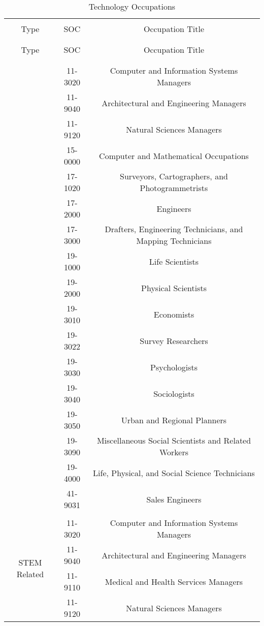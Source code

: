 
\begin{longtable}{ccc} %
  \caption{Technology Occupations} \label{tab:tab_tech_occ}\\
\hline \\[-1.8ex] 
Type & SOC & Occupation Title \\ 
\hline \\[-1.8ex] 
\endfirsthead
\hline \\[-1.8ex] 
Type & SOC & Occupation Title \\ 
\hline \\[-1.8ex] 
\endhead
\hline \\[-1.8ex] 
\endfoot
\multirow{17}{*}{STEM} & 11-3020 & Computer and Information Systems Managers \\ 
 & 11-9040 & Architectural and Engineering Managers \\ 
 & 11-9120 & Natural Sciences Managers \\ 
 & 15-0000 & Computer and Mathematical Occupations \\ 
 & 17-1020 & Surveyors, Cartographers, and Photogrammetrists  \\ 
 & 17-2000 & Engineers \\ 
 & 17-3000 & Drafters, Engineering Technicians, and Mapping Technicians \\ 
 & 19-1000 & Life Scientists \\ 
 & 19-2000 & Physical Scientists  \\ 
 & 19-3010 & Economists \\ 
 & 19-3022 & Survey Researchers \\ 
 & 19-3030 & Psychologists  \\ 
 & 19-3040 & Sociologists \\ 
 & 19-3050 & Urban and Regional Planners \\ 
 & 19-3090 & Miscellaneous Social Scientists and Related Workers  \\ 
 & 19-4000 & Life, Physical, and Social Science Technicians  \\ 
 & 41-9031 & Sales Engineers \\ 
\hline \\[-1.8ex] 
\multirow{17}{*}{STEM Related} & 11-3020 & Computer and Information Systems Managers \\ 
 & 11-9040 & Architectural and Engineering Managers \\ 
 & 11-9110 & Medical and Health Services Managers  \\ 
 & 11-9120 & Natural Sciences Managers \\ 

\end{longtable}
